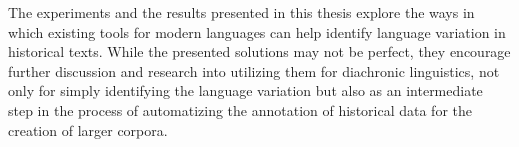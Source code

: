 The experiments and the results presented in this thesis explore the ways in which existing tools for modern languages can help identify language variation in historical texts. While the presented solutions may not be perfect, they encourage further discussion and research into utilizing them for diachronic linguistics, not only for simply identifying the language variation but also as an intermediate step in the process of automatizing the annotation of historical data for the creation of larger corpora. 